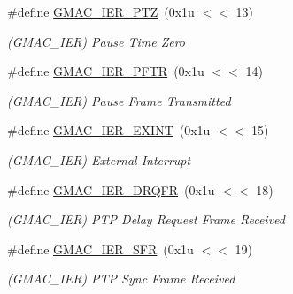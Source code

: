 \begin{DoxyCompactItemize}
\mbox{\label{group__SAME70__GMAC_ga8bb285f47f78dab1b92528933f2274b2}} 
\#define \mbox{\hyperlink{group__SAME70__GMAC_ga8bb285f47f78dab1b92528933f2274b2}{G\+M\+A\+C\+\_\+\+I\+E\+R\+\_\+\+P\+TZ}}~(0x1u $<$$<$ 13)
\begin{DoxyCompactList}\small\item\em (G\+M\+A\+C\+\_\+\+I\+ER) Pause Time Zero \end{DoxyCompactList}\item 
\mbox{\label{group__SAME70__GMAC_ga2b78cbe16974cb9bedecb392103e18dc}} 
\#define \mbox{\hyperlink{group__SAME70__GMAC_ga2b78cbe16974cb9bedecb392103e18dc}{G\+M\+A\+C\+\_\+\+I\+E\+R\+\_\+\+P\+F\+TR}}~(0x1u $<$$<$ 14)
\begin{DoxyCompactList}\small\item\em (G\+M\+A\+C\+\_\+\+I\+ER) Pause Frame Transmitted \end{DoxyCompactList}\item 
\mbox{\label{group__SAME70__GMAC_ga3dbf3260c792602c0db9d47c97fa6327}} 
\#define \mbox{\hyperlink{group__SAME70__GMAC_ga3dbf3260c792602c0db9d47c97fa6327}{G\+M\+A\+C\+\_\+\+I\+E\+R\+\_\+\+E\+X\+I\+NT}}~(0x1u $<$$<$ 15)
\begin{DoxyCompactList}\small\item\em (G\+M\+A\+C\+\_\+\+I\+ER) External Interrupt \end{DoxyCompactList}\item 
\mbox{\label{group__SAME70__GMAC_ga388530fc53f2ab20530d3467a74e1937}} 
\#define \mbox{\hyperlink{group__SAME70__GMAC_ga388530fc53f2ab20530d3467a74e1937}{G\+M\+A\+C\+\_\+\+I\+E\+R\+\_\+\+D\+R\+Q\+FR}}~(0x1u $<$$<$ 18)
\begin{DoxyCompactList}\small\item\em (G\+M\+A\+C\+\_\+\+I\+ER) P\+TP Delay Request Frame Received \end{DoxyCompactList}\item 
\mbox{\label{group__SAME70__GMAC_gad46072573e1c7ecdd4b2aac843abda1d}} 
\#define \mbox{\hyperlink{group__SAME70__GMAC_gad46072573e1c7ecdd4b2aac843abda1d}{G\+M\+A\+C\+\_\+\+I\+E\+R\+\_\+\+S\+FR}}~(0x1u $<$$<$ 19)
\begin{DoxyCompactList}\small\item\em (G\+M\+A\+C\+\_\+\+I\+ER) P\+TP Sync Frame Received \end{DoxyCompactList}\item 
$$
\end{DoxyCompactItemize}
